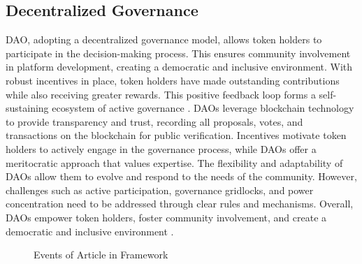 \documentclass[lettersize,journal]{IEEEtran}
\begin{document}
\subsection{Decentralized Governance}

DAO, adopting a decentralized governance model, allows token holders to participate in the decision-making process. This ensures community involvement in platform development, creating a democratic and inclusive environment. With robust incentives in place, token holders have made outstanding contributions while also receiving greater rewards. This positive feedback loop forms a self-sustaining ecosystem of active governance \cite{beck2018governance}. DAOs leverage blockchain technology to provide transparency and trust, recording all proposals, votes, and transactions on the blockchain for public verification. Incentives motivate token holders to actively engage in the governance process, while DAOs offer a meritocratic approach that values expertise. The flexibility and adaptability of DAOs allow them to evolve and respond to the needs of the community. However, challenges such as active participation, governance gridlocks, and power concentration need to be addressed through clear rules and mechanisms. Overall, DAOs empower token holders, foster community involvement, and create a democratic and inclusive environment \cite{jensen2019theory}.

\begin{figure}[ht]
  \caption{Events of Article in Framework}
  \label{fig:decentralized_governance}
\end{figure}
\end{document}
